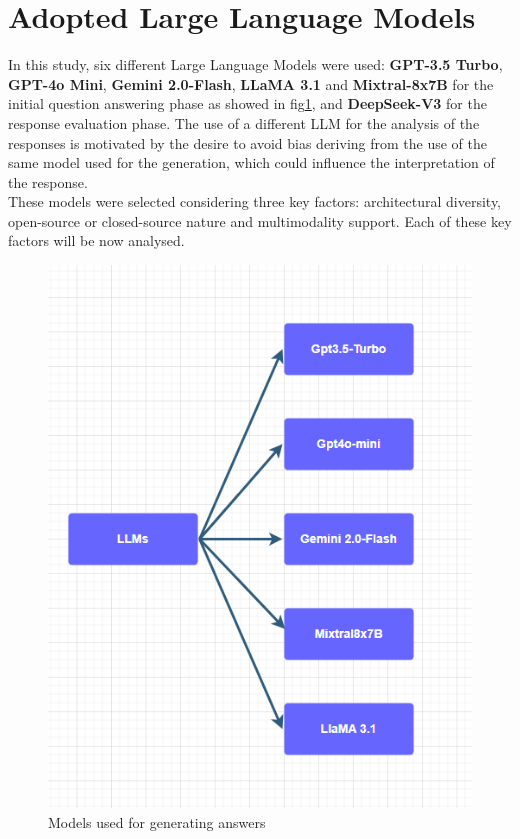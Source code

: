 \section{Adopted Large Language Models}
In this study, six different Large Language Models were used: \textbf{GPT-3.5 Turbo}, \textbf{GPT-4o Mini}, \textbf{Gemini 2.0-Flash}, \textbf{LLaMA 3.1} and \textbf{Mixtral-8x7B} for the initial question answering phase as showed in fig\ref{fig:models}, and \textbf{DeepSeek-V3} for the response evaluation phase. The use of a different LLM for the analysis of the responses is motivated by the desire to avoid bias deriving from the use of the same model used for the generation, which could influence the interpretation of the response.
\\These models were selected considering three key factors: architectural diversity, open-source or closed-source nature and multimodality support. Each of these key factors will be now analysed.
\begin{figure}[H]
    \centering
    \includegraphics[width=0.7\linewidth]{Figures/Models.png}
    \caption{Models used for generating answers}
    \label{fig:models}
\end{figure}
